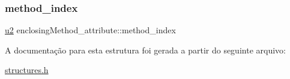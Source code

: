 \subsubsection{\texorpdfstring{method\+\_\+index}{method\_index}}
{\footnotesize\ttfamily \hyperlink{lista__operandos_8h_a732cde1300aafb73b0ea6c2558a7a54f}{u2} enclosing\+Method\+\_\+attribute\+::method\+\_\+index}



A documentação para esta estrutura foi gerada a partir do seguinte arquivo\+:\begin{DoxyCompactItemize}
\item 
\hyperlink{structures_8h}{structures.\+h}\end{DoxyCompactItemize}
